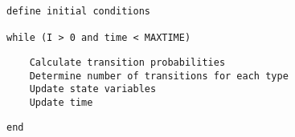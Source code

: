 \documentclass[margin,line,11pt]{article}
\begin{document}
\hfill\begin{minipage}{\dimexpr\textwidth-5cm}
\begin{verbatim}
define initial conditions

while (I > 0 and time < MAXTIME)
\end{verbatim}
\hfill\begin{minipage}{\dimexpr\textwidth-1cm}
\begin{verbatim}
	Calculate transition probabilities
	Determine number of transitions for each type
	Update state variables 
	Update time
\end{verbatim}
\end{minipage}
\begin{verbatim}
end
\end{verbatim}
\xdef\tpd{\the\prevdepth}
\end{minipage}

\end{document}
